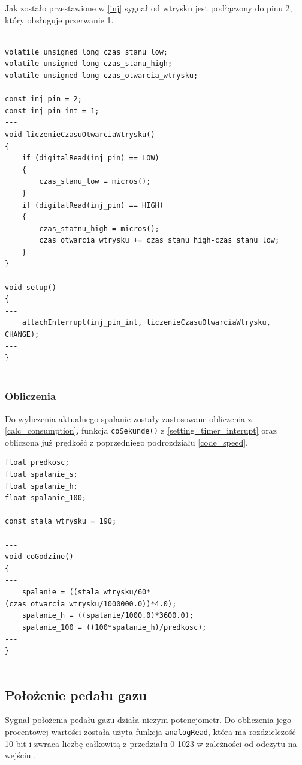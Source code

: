 Jak zostało przestawione w \ref{inj} sygnał od wtrysku jest podłączony do pinu 2, który obsługuje przerwanie 1.

\begin{lstlisting}[label=list:inj_int,caption=Ustawianie przerwania wtrysku,
basicstyle=\footnotesize\ttfamily]

volatile unsigned long czas_stanu_low;
volatile unsigned long czas_stanu_high;
volatile unsigned long czas_otwarcia_wtrysku;

const inj_pin = 2;
const inj_pin_int = 1;
---
void liczenieCzasuOtwarciaWtrysku()
{
    if (digitalRead(inj_pin) == LOW)
    {
        czas_stanu_low = micros();
    }
    if (digitalRead(inj_pin) == HIGH)
    {
        czas_statnu_high = micros();
        czas_otwarcia_wtrysku += czas_stanu_high-czas_stanu_low;
    }
}
---
void setup()
{
---
    attachInterrupt(inj_pin_int, liczenieCzasuOtwarciaWtrysku, CHANGE);
---
}
---
\end{lstlisting}

\subsubsection{Obliczenia}

Do wyliczenia aktualnego spalanie zostały zastosowane obliczenia z \ref{calc_consumption}, funkcja \texttt{coSekunde()} z \ref{setting_timer_interupt} oraz obliczona już prędkość z poprzedniego podrozdziału \ref{code_speed}.

\begin{lstlisting}[label=list:vss_int,caption=Obliczanie aktualnego spalania,
basicstyle=\footnotesize\ttfamily]
float predkosc;
float spalanie_s;
float spalanie_h;
float spalanie_100;

const stala_wtrysku = 190;

---
void coGodzine()
{
---
    spalanie = ((stala_wtrysku/60*(czas_otwarcia_wtrysku/1000000.0))*4.0);
    spalanie_h = ((spalanie/1000.0)*3600.0);
    spalanie_100 = ((100*spalanie_h)/predkosc);
---
}


\end{lstlisting}


\subsection{Położenie pedału gazu}

Sygnał położenia pedału gazu działa niczym potencjometr. Do obliczenia jego procentowej wartości została użyta funkcja \texttt{analogRead}, która ma rozdzielczość 10 bit i zwraca liczbę całkowitą z przedziału 0-1023 w zależności od odczytu na wejściu \cite{ard_ref}.


